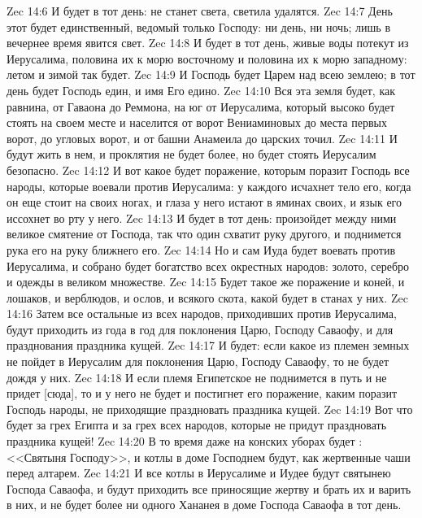\vs Zec 14:6 И будет в тот день: не станет света, светила удалятся.
\vs Zec 14:7 День этот будет единственный, ведомый только Господу: ни день, ни ночь; лишь в вечернее время явится свет.
\vs Zec 14:8 И будет в тот день, живые воды потекут из Иерусалима, половина их к морю восточному и половина их к морю западному: летом и зимой так будет.
\vs Zec 14:9 И Господь будет Царем над всею землею; в тот день будет Господь един, и имя Его едино.
\vs Zec 14:10 Вся эта земля будет, как равнина, от Гаваона до Реммона, на юг от Иерусалима, который высоко будет стоять на своем месте и населится от ворот Вениаминовых до места первых ворот, до угловых ворот, и от башни Анамеила до царских точил.
\vs Zec 14:11 И будут жить в нем, и проклятия не будет более, но будет стоять Иерусалим безопасно.
\vs Zec 14:12 И вот какое будет поражение, которым поразит Господь все народы, которые воевали против Иерусалима: у каждого исчахнет тело его, когда он еще стоит на своих ногах, и глаза у него истают в яминах своих, и язык его иссохнет во рту у него.
\vs Zec 14:13 И будет в тот день: произойдет между ними великое смятение от Господа, так что один схватит руку другого, и поднимется рука его на руку ближнего его.
\vs Zec 14:14 Но и сам Иуда будет воевать против Иерусалима, и собрано будет богатство всех окрестных народов: золото, серебро и одежды в великом множестве.
\vs Zec 14:15 Будет такое же поражение и коней, и лошаков, и верблюдов, и ослов, и всякого скота, какой будет в станах у них.
\vs Zec 14:16 Затем все остальные из всех народов, приходивших против Иерусалима, будут приходить из года в год для поклонения Царю, Господу Саваофу, и для празднования праздника кущей.
\vs Zec 14:17 И будет: если какое из племен земных не пойдет в Иерусалим для поклонения Царю, Господу Саваофу, то не будет дождя у них.
\vs Zec 14:18 И если племя Египетское не поднимется в путь и не придет [сюда], то и у него не будет  и постигнет его поражение, каким поразит Господь народы, не приходящие праздновать праздника кущей.
\vs Zec 14:19 Вот что будет за грех Египта и за грех всех народов, которые не придут праздновать праздника кущей!
\vs Zec 14:20 В то время даже на конских уборах будет : <<Святыня Господу>>, и котлы в доме Господнем будут, как жертвенные чаши перед алтарем.
\vs Zec 14:21 И все котлы в Иерусалиме и Иудее будут святынею Господа Саваофа, и будут приходить все приносящие жертву и брать их и варить в них, и не будет более ни одного Хананея в доме Господа Саваофа в тот день.
